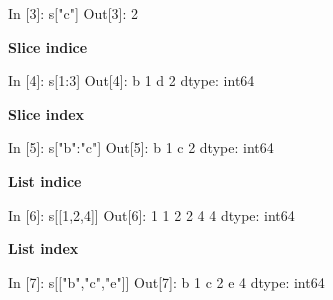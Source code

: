 \documentclass[
]{book}
\newenvironment{Shaded}{\begin{snugshade}}{\end{snugshade}}
\newcommand{\DecValTok}[1]{\textcolor[rgb]{0.00,0.00,0.81}{#1}}
\newcommand{\NormalTok}[1]{#1}
\newcommand{\StringTok}[1]{\textcolor[rgb]{0.31,0.60,0.02}{#1}}
\begin{document}
\begin{Shaded}
\begin{Highlighting}[]
\NormalTok{In [}\DecValTok{3}\NormalTok{]: s[}\StringTok{"c"}\NormalTok{]}
\NormalTok{Out[}\DecValTok{3}\NormalTok{]: }\DecValTok{2} 
\end{Highlighting}
\end{Shaded}

\textbf{Slice indice}

\begin{Shaded}
\begin{Highlighting}[]
\NormalTok{In [}\DecValTok{4}\NormalTok{]: s[}\DecValTok{1}\NormalTok{:}\DecValTok{3}\NormalTok{]}
\NormalTok{Out[}\DecValTok{4}\NormalTok{]:}
\NormalTok{b    }\DecValTok{1}
\NormalTok{d    }\DecValTok{2}
\NormalTok{dtype: int64}
\end{Highlighting}
\end{Shaded}

\textbf{Slice index}

\begin{Shaded}
\begin{Highlighting}[]
\NormalTok{In [}\DecValTok{5}\NormalTok{]: s[}\StringTok{"b"}\NormalTok{:}\StringTok{"c"}\NormalTok{]}
\NormalTok{Out[}\DecValTok{5}\NormalTok{]: }
\NormalTok{b    }\DecValTok{1}
\NormalTok{c    }\DecValTok{2}
\NormalTok{dtype: int64}
\end{Highlighting}
\end{Shaded}

\textbf{List indice}

\begin{Shaded}
\begin{Highlighting}[]
\NormalTok{In [}\DecValTok{6}\NormalTok{]: s[[}\DecValTok{1}\NormalTok{,}\DecValTok{2}\NormalTok{,}\DecValTok{4}\NormalTok{]]}
\NormalTok{Out[}\DecValTok{6}\NormalTok{]:}
\DecValTok{1}    \DecValTok{1}
\DecValTok{2}    \DecValTok{2}
\DecValTok{4}    \DecValTok{4}
\NormalTok{dtype: int64}
\end{Highlighting}
\end{Shaded}

\textbf{List index}

\begin{Shaded}
\begin{Highlighting}[]
\NormalTok{In [}\DecValTok{7}\NormalTok{]: s[[}\StringTok{"b"}\NormalTok{,}\StringTok{"c"}\NormalTok{,}\StringTok{"e"}\NormalTok{]]}
\NormalTok{Out[}\DecValTok{7}\NormalTok{]:}
\NormalTok{b    }\DecValTok{1}
\NormalTok{c    }\DecValTok{2}
\NormalTok{e    }\DecValTok{4}
\NormalTok{dtype: int64}
\end{Highlighting}
\end{Shaded}
\end{document}
